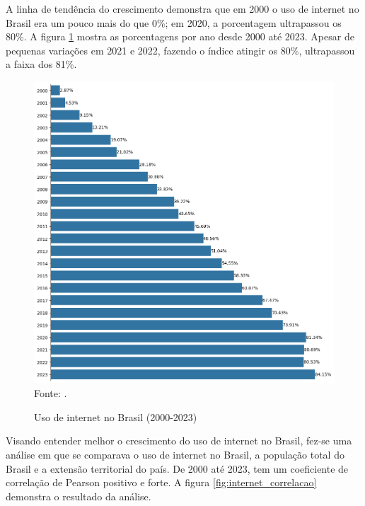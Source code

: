 A linha de tendência do crescimento demonstra que em 2000 o uso de internet no Brasil era um pouco mais do que 0\%; em 2020, a porcentagem ultrapassou os 80\%. A figura \ref{fig:uso_internet_brasil_itu} mostra as porcentagens por ano desde 2000 até 2023. Apesar de pequenas variações em 2021 e 2022, fazendo o índice atingir os 80\%, ultrapassou a faixa dos 81\%.

\begin{figure}[H]
    \centering
    \caption{Uso de internet no Brasil (2000-2023)}
    \includegraphics[width=1\linewidth]{figuras/internet/barplot_uso_internet_brasil_itu.png}
    \label{fig:uso_internet_brasil_itu}
    \footnotesize{Fonte: \cite{ITU_uso_internet_brasil}.}
\end{figure}

Visando entender melhor o crescimento do uso de internet no Brasil, fez-se uma análise em que se comparava o uso de internet no Brasil, a população total do Brasil e a extensão territorial do país. De 2000 até 2023, tem um coeficiente de correlação de Pearson positivo e forte. A figura \ref{fig:internet_correlacao} demonstra o resultado da análise.

